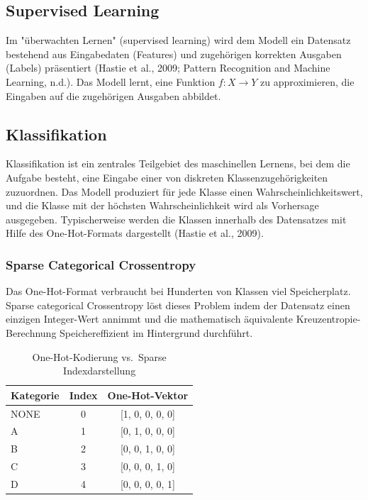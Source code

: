 \subsection{Supervised Learning}

Im "überwachten Lernen" (supervised learning) wird dem Modell ein Datensatz bestehend aus Eingabedaten (Features) und zugehörigen korrekten Ausgaben (Labels) präsentiert (Hastie et al., 2009; Pattern Recognition and Machine Learning, n.d.). Das Modell lernt, eine Funktion $f: X \rightarrow Y$ zu approximieren, die Eingaben auf die zugehörigen Ausgaben abbildet.

\subsection{Klassifikation}

Klassifikation ist ein zentrales Teilgebiet des maschinellen Lernens, bei dem die Aufgabe besteht, eine Eingabe einer von diskreten Klassenzugehörigkeiten zuzuordnen. Das Modell produziert für jede Klasse einen Wahrscheinlichkeitswert, und die Klasse mit der höchsten Wahrscheinlichkeit wird als Vorhersage ausgegeben. Typischerweise werden die Klassen innerhalb des Datensatzes mit Hilfe des One-Hot-Formats dargestellt (Hastie et al., 2009).

\subsubsection{Sparse Categorical Crossentropy}

Das One-Hot-Format verbraucht bei Hunderten von Klassen viel Speicherplatz. Sparse categorical Crossentropy löst dieses Problem indem der Datensatz einen einzigen Integer-Wert annimmt und die mathematisch äquivalente Kreuzentropie-Berechnung Speichereffizient im Hintergrund durchführt.

\begin{table}[htbp]
    \centering
    \caption{One-Hot-Kodierung vs.\ Sparse Indexdarstellung}
    \label{tab:one-hot-codierung}
    \begin{tabular}{|l|c|c|}
        \hline
        \textbf{Kategorie} & \textbf{Index} & \textbf{One-Hot-Vektor} \\
        \hline
        NONE & 0 & [1, 0, 0, 0, 0] \\
        \hline
        A & 1 & [0, 1, 0, 0, 0] \\
        \hline
        B & 2 & [0, 0, 1, 0, 0] \\
        \hline
        C & 3 & [0, 0, 0, 1, 0] \\
        \hline
        D & 4 & [0, 0, 0, 0, 1] \\
        \hline
    \end{tabular}
\end{table}

